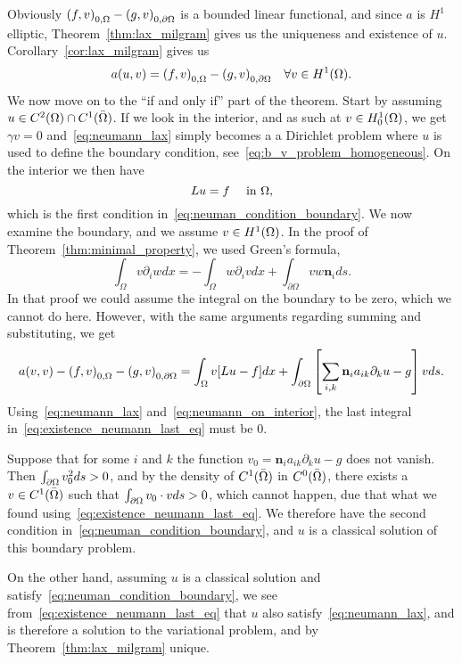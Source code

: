 \begin{bev}
   Obviously $ {(f,v)}_{0,\Omega} - {(g,v)}_{0,\partial\Omega}$ is a bounded linear functional, 
   and since $a$ is $H^1$ elliptic, Theorem~\ref{thm:lax_milgram} gives us the
   uniqueness and existence of $u$.
   Corollary~\ref{cor:lax_milgram} gives us
   \begin{equation}
      a(u,v) = {(f,v)}_{0,\Omega} - {(g,v)}_{0,\partial\Omega} \quad \forall v \in H^1(\Omega). \label{eq:neumann_lax}
   \end{equation}
   We now move on to the ``if and only if'' part of the theorem. Start by 
   assuming $u \in C^2(\Omega)\cap C^1(\bar{\Omega})$.
   If we look in the interior, and as such at $v \in H^1_0(\Omega)$, we get $\gamma v=0$ 
   and~\eqref{eq:neumann_lax} simply becomes a a Dirichlet problem where 
   $u$ is used to define the boundary condition, see~\eqref{eq:b_v_problem_homogeneous}.
   On the interior we then have 
   \begin{equation}
    Lu = f \quad \text{ in }\Omega, \label{eq:neumann_on_interior}
   \end{equation} 
   which is the first condition in~\eqref{eq:neuman_condition_boundary}.
   We now examine the boundary, and we assume $v\in H^1(\Omega)$.
   In the proof of Theorem~\ref{thm:minimal_property}, we used Green's formula,
    \begin{equation} %
        \int_\Omega v\partial_i w dx = -\int_\Omega w \partial_i v dx + \int_{\partial \Omega} v w \mathbf{n}_i ds.
    \end{equation}
   In that proof we could assume the integral on the boundary to be zero, which 
   we cannot do here. However, with the same arguments regarding summing and substituting, 
   we get
   \begin{equation}
      a(v,v) - {(f,v)}_{0,\Omega} - {(g,v)}_{0,\partial\Omega} = 
      \int_\Omega v[Lu - f] dx + \int_{\partial \Omega}
     \left[ \sum_{i,k}  \mathbf{n}_i a_{ik} \partial_k u-g \right]v ds.
     \label{eq:existence_neumann_last_eq}
   \end{equation}
   Using~\eqref{eq:neumann_lax} and~\eqref{eq:neumann_on_interior},
   the last integral in~\eqref{eq:existence_neumann_last_eq} must be $0$.

   Suppose that for some $i$ and $k$ the function $v_0 = \mathbf{n}_i a_{ik} \partial_k u -g$ does 
   not vanish. Then $\int_{\partial\Omega}v_0^2ds>0$, and by the density of 
   $C^1(\bar{\Omega})$ in $C^0(\bar{\Omega})$, there exists a $v\in C^1(\bar{\Omega})$
   such that  $\int_{\partial\Omega}v_0\cdot vds>0$, which cannot happen, due that 
   what we found using~\eqref{eq:existence_neumann_last_eq}. 
   We therefore have the second condition in~\eqref{eq:neuman_condition_boundary},
   and $u$ is a classical solution of this boundary problem.

   On the other hand, assuming $u$ is a classical solution and satisfy~\eqref{eq:neuman_condition_boundary},
   we see from~\eqref{eq:existence_neumann_last_eq} that $u$ also satisfy~\eqref{eq:neumann_lax}, and is therefore a solution to the variational 
   problem, and by Theorem~\ref{thm:lax_milgram} unique.
\end{bev}

